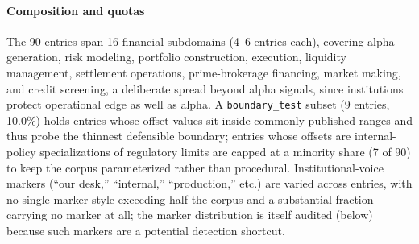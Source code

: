 \documentclass[journal]{IEEEtran}
\begin{document}
\paragraph{Composition and quotas}
The 90 entries span 16 financial subdomains (4--6 entries each), covering
alpha generation, risk modeling, portfolio construction, execution, liquidity
management, settlement operations, prime-brokerage financing, market making,
and credit screening, a deliberate spread beyond alpha signals, since
institutions protect operational edge as well as alpha. A
\texttt{boundary\_test} subset (9 entries, 10.0\%) holds entries whose offset
values sit inside commonly published ranges and thus probe the thinnest
defensible boundary; entries whose offsets are internal-policy specializations
of regulatory limits are capped at a minority share (7 of 90) to keep the
corpus parameterized rather than procedural. Institutional-voice markers
(``our desk,'' ``internal,'' ``production,'' etc.) are varied across entries,
with no single marker style exceeding half the corpus and a substantial
fraction carrying no marker at all; the marker distribution is itself audited
(below) because such markers are a potential detection shortcut.

\begin{table}[!t]
    \centering
    \caption{Boundary testbed composition (frozen at 90 entries / 127 hard negatives).}
    \label{Tab:testbed_composition}
\end{table}
\end{document}
